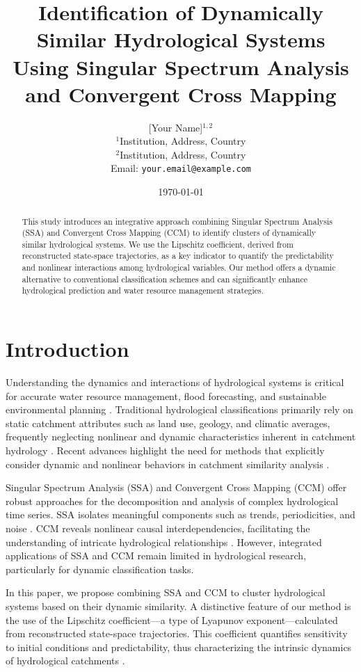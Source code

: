 \documentclass[11pt,a4paper]{article}
\title{Identification of Dynamically Similar Hydrological Systems Using Singular Spectrum Analysis and Convergent Cross Mapping}
\author{[Your Name]$^{1,2}$ \\
\small $^{1}$Institution, Address, Country\\
\small $^{2}$Institution, Address, Country\\
\small Email: \texttt{your.email@example.com}}
\date{\today}
\begin{document}
\maketitle

\begin{abstract}
This study introduces an integrative approach combining Singular Spectrum Analysis (SSA) and Convergent Cross Mapping (CCM) to identify clusters of dynamically similar hydrological systems.
We use the Lipschitz coefficient, derived from reconstructed state-space trajectories, as a key indicator to quantify the predictability and nonlinear interactions among hydrological variables.
Our method offers a dynamic alternative to conventional classification schemes and can significantly enhance hydrological prediction and water resource management strategies. 
\end{abstract}

\section{Introduction}

Understanding the dynamics and interactions of hydrological systems is critical for accurate water resource management, flood forecasting, and sustainable environmental planning \citep{montanari2013understanding, sivapalan2012sociohydrology}.
Traditional hydrological classifications primarily rely on static catchment attributes such as land use, geology, and climatic averages, frequently neglecting nonlinear and dynamic characteristics inherent in catchment hydrology \citep{sawicz2011catchment, wagener2007catchment}.
Recent advances highlight the need for methods that explicitly consider dynamic and nonlinear behaviors in catchment similarity analysis \citep{wang2021nonlinear, krakovska2019causality}. 

Singular Spectrum Analysis (SSA) and Convergent Cross Mapping (CCM) offer robust approaches for the decomposition and analysis of complex hydrological time series.
SSA isolates meaningful components such as trends, periodicities, and noise \citep{ghil2002advanced, elsner2009singular}.
CCM reveals nonlinear causal interdependencies, facilitating the understanding of intricate hydrological relationships \citep{sugihara2012detecting, ye2015distinguishing}.
However, integrated applications of SSA and CCM remain limited in hydrological research, particularly for dynamic classification tasks.

In this paper, we propose combining SSA and CCM to cluster hydrological systems based on their dynamic similarity.
A distinctive feature of our method is the use of the Lipschitz coefficient—a type of Lyapunov exponent—calculated from reconstructed state-space trajectories.
This coefficient quantifies sensitivity to initial conditions and predictability, thus characterizing the intrinsic dynamics of hydrological catchments \citep{kantz2004nonlinear, wolf1985determining}.
\end{document}
